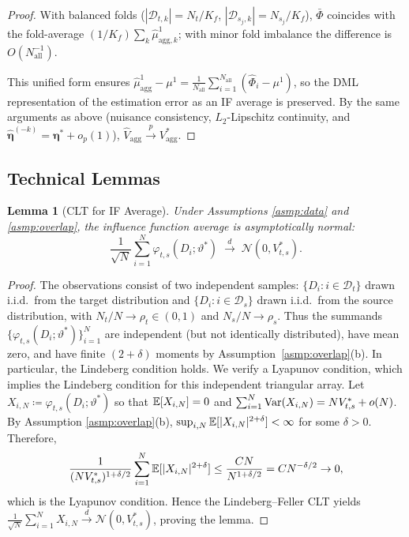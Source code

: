 \documentclass{article}
\newtheorem{lemma}[theorem]{Lemma}
\begin{document}
\begin{proof}
With balanced folds ($|\mathcal{D}_{t,k}|=N_t/K_f$, $|\mathcal{D}_{s_j,k}|=N_{s_j}/K_f$), $\bar{\Phi}$ coincides with the fold-average $(1/K_f)\sum_k \widehat{\mu}^1_{\mathrm{agg},k}$; with minor fold imbalance the difference is $O(N_{\mathrm{all}}^{-1})$.

This unified form ensures $\widehat{\mu}^1_{\mathrm{agg}} - \mu^1 = \frac{1}{N_{\mathrm{all}}}\sum_{i=1}^{N_{\mathrm{all}}}(\widehat{\Phi}_i - \mu^1)$, so the DML representation of the estimation error as an IF average is preserved. By the same arguments as above (nuisance consistency, $L_2$-Lipschitz continuity, and $\widehat{\boldsymbol{\eta}}^{(-k)}=\boldsymbol{\eta}^*+o_p(1)$), $\widehat{V}_{\mathrm{agg}} \xrightarrow{p} V^*_{\mathrm{agg}}$.
\end{proof}

\subsection{Technical Lemmas}

\begin{lemma}[CLT for IF Average]\label{lem:clt}
Under Assumptions \ref{asmp:data} and \ref{asmp:overlap}, the influence function average is asymptotically normal:
\[
\frac{1}{\sqrt{N}}\sum_{i=1}^{N}\varphi_{t,s}(D_i;\vartheta^*)
\;\xrightarrow{d}\; \mathcal{N}(0,V^*_{t,s}).
\]
\end{lemma}
\begin{proof}
The observations consist of two independent samples: $\{D_i: i \in \mathcal{D}_t\}$ drawn i.i.d.\ from the target distribution and $\{D_i: i \in \mathcal{D}_s\}$ drawn i.i.d.\ from the source distribution, with $N_t/N \to \rho_t \in (0,1)$ and $N_s/N \to \rho_s$.
Thus the summands $\{\varphi_{t,s}(D_i;\vartheta^*)\}_{i=1}^N$ are independent (but not identically distributed), have mean zero, and have finite $(2+\delta)$ moments by Assumption~\ref{asmp:overlap}(b). In particular, the Lindeberg condition holds.
We verify a Lyapunov condition, which implies the Lindeberg condition for this independent triangular array.
Let $X_{i,N}\coloneqq \varphi_{t,s}(D_i;\vartheta^*)$ so that $\operatorname{\mathbb{E}}[X_{i,N}]=0$ and $\sum_{i=1}^{N}\operatorname{Var}(X_{i,N})=NV^*_{t,s}+o(N)$.
By Assumption \ref{asmp:overlap}(b), $\sup_{i,N}\operatorname{\mathbb{E}}[|X_{i,N}|^{2+\delta}]<\infty$ for some $\delta>0$.
Therefore,
\[
\frac{1}{(NV^*_{t,s})^{1+\delta/2}}\sum_{i=1}^{N}\operatorname{\mathbb{E}}[|X_{i,N}|^{2+\delta}]
\le
\frac{C N}{N^{1+\delta/2}}
=
CN^{-\delta/2}\to 0,
\]
which is the Lyapunov condition. Hence the Lindeberg--Feller CLT yields
\(
\frac{1}{\sqrt{N}}\sum_{i=1}^{N}X_{i,N}\xrightarrow{d}\mathcal{N}(0,V^*_{t,s})
\),
proving the lemma.
\end{proof}
\end{document}
